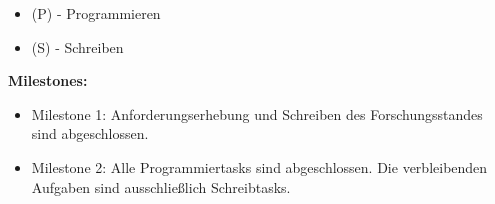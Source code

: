 \begin{itemize}
    \item (P) - Programmieren
    \item (S) - Schreiben
\end{itemize}

\textbf{Milestones:}
\begin{itemize}
    \item Milestone 1: Anforderungserhebung und Schreiben des Forschungsstandes sind abgeschlossen.
    \item Milestone 2: Alle Programmiertasks sind abgeschlossen. Die verbleibenden Aufgaben sind ausschließlich Schreibtasks.
\end{itemize}